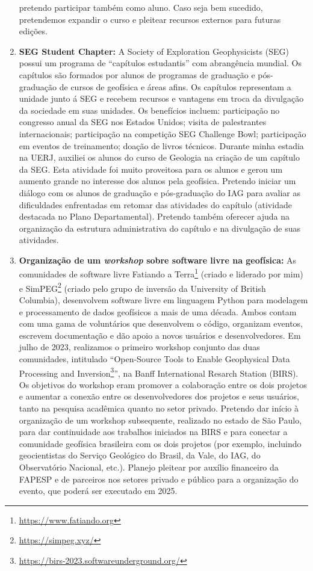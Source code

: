 \documentclass[12pt,a4paper,oneside]{book}
\begin{document}
\begin{enumerate}
    pretendo participar também como aluno. Caso seja bem sucedido, pretendemos
    expandir o curso e pleitear recursos externos para futuras edições.
  \item \textbf{SEG Student Chapter:} A Society of Exploration Geophysicists
    (SEG) possui um programa de ``capítulos estudantis'' com abrangência
    mundial. Os capítulos são formados por alunos de programas de graduação e
    pós-graduação de cursos de geofísica e áreas afins. Os capítulos
    representam a unidade junto á SEG e recebem recursos e vantagens em troca
    da divulgação da sociedade em suas unidades. Os benefícios incluem:
    participação no congresso anual da SEG nos Estados Unidos; visita de
    palestrantes internacionais; participação na competição SEG Challenge Bowl;
    participação em eventos de treinamento; doação de livros técnicos. Durante
    minha estadia na UERJ, auxiliei os alunos do curso de Geologia na criação
    de um capítulo da SEG. Esta atividade foi muito proveitosa para os alunos
    e gerou um aumento grande no interesse dos alunos pela geofísica. Pretendo
    iniciar um diálogo com os alunos de graduação e pós-graduação do IAG para
    avaliar as dificuldades enfrentadas em retomar das atividades do capítulo
    (atividade destacada no Plano Departamental). Pretendo também oferecer
    ajuda na organização da estrutura administrativa do capítulo e na
    divulgação de suas atividades.
  \item \textbf{Organização de um \emph{workshop} sobre software livre na
    geofísica:}
    As comunidades de software livre Fatiando a
    Terra\footnote{\url{https://www.fatiando.org}} (criado e liderado por mim)
    e SimPEG\footnote{\url{https://simpeg.xyz/}}
    (criado pelo grupo de inversão da University of British Columbia),
    desenvolvem software livre em linguagem Python para modelagem e
    processamento de dados geofísicos a mais de uma década. Ambos contam com uma
    gama de voluntários que desenvolvem o código, organizam eventos, escrevem
    documentação e dão apoio a novos usuários e desenvolvedores.
    Em julho de 2023, realizamos o primeiro workshop conjunto das duas
    comunidades, intitulado
    ``Open-Source Tools to Enable Geophysical Data Processing and
    Inversion\footnote{\url{https://birs-2023.softwareunderground.org/}}'', na
    Banff International Resarch Station (BIRS). Os objetivos do workshop eram
    promover a colaboração entre os dois projetos e aumentar a conexão entre os
    desenvolvedores dos projetos e seus usuários, tanto na pesquisa acadêmica
    quanto no setor privado. Pretendo dar início à organização de um workshop
    subsequente, realizado no estado de São Paulo, para dar continuidade aos
    trabalhos iniciados na BIRS e para conectar a comunidade geofísica
    brasileira com os dois projetos (por exemplo, incluindo geocientistas do
    Serviço Geológico do Brasil, da Vale, do IAG, do Observatório Nacional,
    etc.). Planejo pleitear por auxílio financeiro da FAPESP e de parceiros nos
    setores privado e público para a organização do evento, que poderá ser
    executado em 2025.
\end{enumerate}
\end{document}
